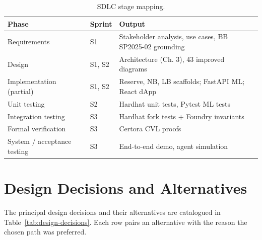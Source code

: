 \documentclass[12pt,a4paper]{report}
\begin{document}
\begin{table}[!t]
\centering
\caption{SDLC stage mapping.}
\label{tab:sdlc}
\small
\begin{tabularx}{\linewidth}{@{}llY@{}}
\toprule
\textbf{Phase} & \textbf{Sprint} & \textbf{Output} \\
\midrule
Requirements & S1 & Stakeholder analysis, use cases, BB SP2025-02 grounding \\
Design & S1, S2 & Architecture (Ch. 3), 43 improved diagrams \\
Implementation (partial) & S1, S2 & Reserve, NB, LB scaffolds; FastAPI ML; React dApp \\
Unit testing & S2 & Hardhat unit tests, Pytest ML tests \\
Integration testing & S3 & Hardhat fork tests + Foundry invariants \\
Formal verification & S3 & Certora CVL proofs \\
System / acceptance testing & S3 & End-to-end demo, agent simulation \\
\bottomrule
\end{tabularx}
\end{table}

\section{Design Decisions and Alternatives}
\label{sec:design-decisions}

The principal design decisions and their alternatives are catalogued in Table~\ref{tab:design-decisions}. Each row pairs an alternative with the reason the chosen path was preferred.
\end{document}
